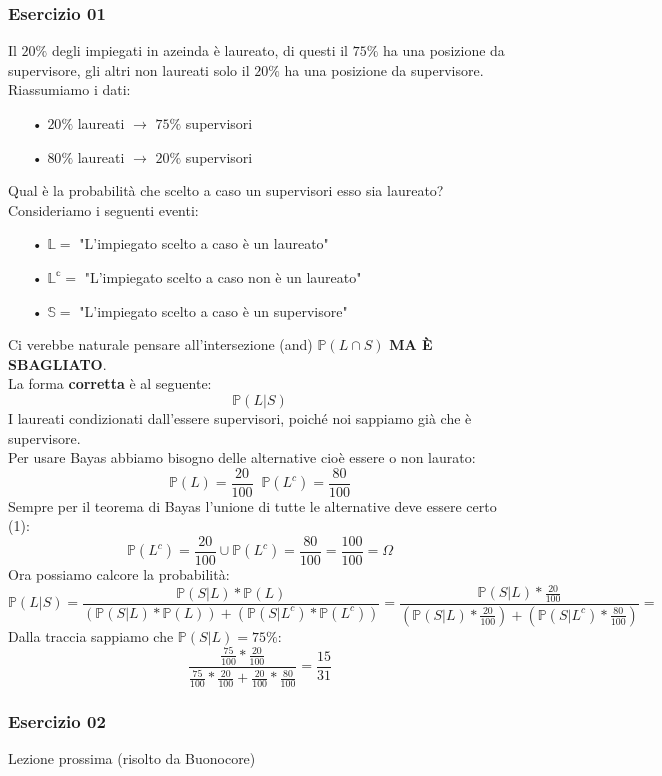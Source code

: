 \subsubsection{Esercizio 01}
Il $20\%$ degli impiegati in azeinda è laureato, di questi il $75\%$ ha una posizione da supervisore, gli altri non laureati solo il $20\%$ ha una posizione da supervisore.\\
Riassumiamo i dati:
\begin{itemize}
\item[•] $20\%$ laureati $\rightarrow$ $75\%$ supervisori
\item[•] $80\%$ laureati $\rightarrow$ $20\%$ supervisori
\end{itemize}
Qual è la probabilità che scelto a caso un supervisori esso sia laureato?\\
Consideriamo i seguenti eventi:
\begin{itemize}
\item[•] $\mathbb{L}=$ "L'impiegato scelto a caso è un laureato"
\item[•] $\mathbb{L^c}=$ "L'impiegato scelto a caso non è un laureato"
\item[•] $\mathbb{S}=$ "L'impiegato scelto a caso è un supervisore"
\end{itemize}
Ci verebbe naturale pensare all'intersezione (and) $\mathbb{P}(L \cap S)$ \textbf{MA 
 È SBAGLIATO}.\\
La forma \textbf{corretta} è al seguente: 
$$ \mathbb{P}(L|S) $$
I laureati condizionati dall'essere supervisori, poiché noi sappiamo già che è supervisore.\\
Per usare Bayas abbiamo bisogno delle alternative cioè essere o non laurato:
$$ \mathbb{P}(L) = \frac{20}{100} \;\; \mathbb{P}(L^c) = \frac{80}{100} $$
Sempre per il teorema di Bayas l'unione di tutte le alternative deve essere certo (1):
$$ \mathbb{P}(L^c) = \frac{20}{100} \cup \mathbb{P}(L^c) = \frac{80}{100} = \frac{100}{100} = \Omega$$
Ora possiamo calcore la probabilità:
$$ \mathbb{P}(L|S) = \frac{\mathbb{P}(S|L) * \mathbb{P}(L)}{(\mathbb{P}(S|L) * \mathbb{P}(L)) + (\mathbb{P}(S|L^c)*\mathbb{P}(L^c))} = \frac{\mathbb{P}(S|L) * \frac{20}{100}}{(\mathbb{P}(S|L) * \frac{20}{100}) + (\mathbb{P}(S|L^c)*\frac{80}{100})} = $$
Dalla traccia sappiamo che $\mathbb{P}(S|L) = 75\%$:
$$ \frac{ \frac{75}{100} * \frac{20}{100} }{ \frac{75}{100}*\frac{20}{100}+\frac{20}{100}*\frac{80}{100} } = \frac{15}{31}$$

\subsubsection{Esercizio 02}
Lezione prossima (risolto da Buonocore)

